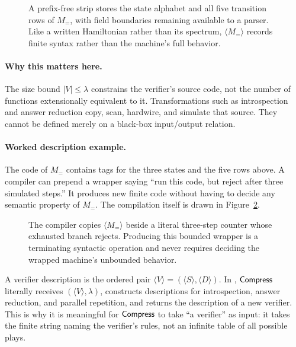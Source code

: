 \begin{figure}[t]
\centering

\caption{A prefix-free strip stores the state alphabet and all five transition rows of \(M_=\), with field boundaries remaining available to a parser.  Like a written Hamiltonian rather than its spectrum, \(\langle M_=\rangle\) records finite syntax rather than the machine's full behavior.}
\label{fig:description-bits}
\end{figure}

\paragraph{Why this matters here.}
The size bound \(|V|\leq\lambda\) constrains the verifier's source code, not
the number of functions extensionally equivalent to it.  Transformations such
as introspection and answer reduction copy, scan, hardwire, and simulate that
source.  They cannot be defined merely on a black-box input/output relation.

\paragraph{Worked description example.}
The code of \(M_=\) contains tags for the three states and the five rows above.
A compiler can prepend a wrapper saying ``run this code, but reject after
three simulated steps.''  It produces new finite code without having to
decide any semantic property of \(M_=\).
The compilation itself is drawn in Figure~\ref{fig:timeout-wrapper}.

\begin{figure}[t]
\centering

\caption{The compiler copies \(\langle M_=\rangle\) beside a literal three-step counter whose exhausted branch rejects.  Producing this bounded wrapper is a terminating syntactic operation and never requires deciding the wrapped machine's unbounded behavior.}
\label{fig:timeout-wrapper}
\end{figure}

A verifier description is the ordered pair
\(\langle V\rangle=(\langle S\rangle,\langle D\rangle)\).  In
, \(\mathsf{Compress}\) literally receives
\((\langle V\rangle,\lambda)\), constructs descriptions for introspection,
answer reduction, and parallel repetition, and returns the description of a
new verifier.  This is why it is meaningful for \(\mathsf{Compress}\) to take ``a
verifier'' as input: it takes the finite string naming the verifier's rules,
not an infinite table of all possible plays.

